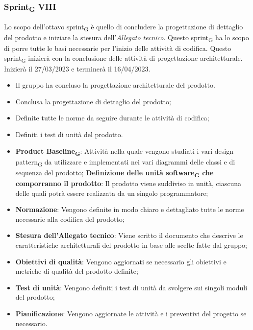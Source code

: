 \subsubsection{Sprint\textsubscript{G} VIII}
Lo scopo dell'ottavo sprint\textsubscript{G} è quello di concludere la progettazione di dettaglio del prodotto e iniziare la stesura dell’\textit{Allegato tecnico}. Questo sprint\textsubscript{G} ha lo scopo di porre tutte le basi necessarie per l'inizio delle attività di codifica.
Questo sprint\textsubscript{G} inizierà con la conclusione delle attività di progettazione architetturale. Inizierà il 27/03/2023 e terminerà il 16/04/2023.

\:
\begin{itemize}
	\item Il gruppo ha concluso la progettazione architetturale del prodotto.
\end{itemize}

\:
\begin{itemize}
	\item Conclusa la progettazione di dettaglio del prodotto;
	\item Definite tutte le norme da seguire durante le attività di codifica;
	\item Definiti i test di unità del prodotto.
\end{itemize}

\:
\begin{itemize}
	\item \textbf{Product Baseline\textsubscript{G}}: Attività nella quale vengono studiati i vari design pattern\textsubscript{G} da utilizzare e implementati nei vari diagrammi delle classi e di sequenza del prodotto;
	\subitem \textbf{Definizione delle unità software\textsubscript{G} che comporranno il prodotto}: Il prodotto viene suddiviso in unità, ciascuna delle quali potrà essere realizzata da un singolo programmatore;
	\item \textbf{Normazione}: Vengono definite in modo chiaro e dettagliato tutte le norme necessarie alla codifica del prodotto;
	\item \textbf{Stesura dell’Allegato tecnico}: Viene scritto il documento che descrive le caratteristiche architetturali del prodotto in base alle scelte fatte dal gruppo;
	\item \textbf{Obiettivi di qualità}: Vengono aggiornati se necessario gli obiettivi e metriche di qualità del prodotto definite;
	\item \textbf{Test di unità}: Vengono definiti i test di unità da svolgere sui singoli moduli del prodotto;
	\item \textbf{Pianificazione}: Vengono aggiornate le attività e i preventivi del progetto se necessario.
\end{itemize}

